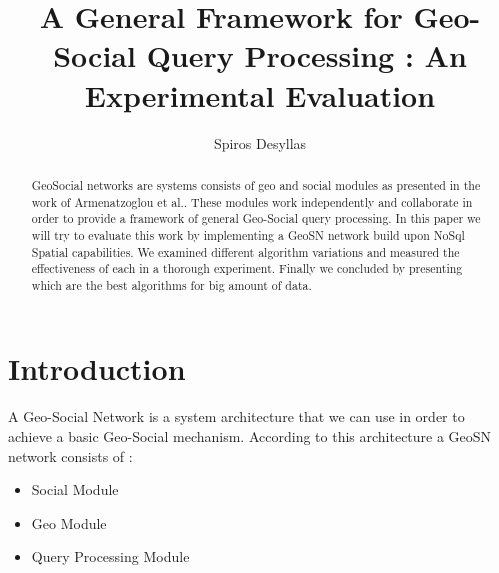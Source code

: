 \documentclass[prodmode,acmtods]{acmsmall} %
\begin{document}

\title{A General Framework for Geo-Social Query Processing
: An Experimental
Evaluation
}
\author{Spiros Desyllas
}

\begin{abstract}
GeoSocial networks are systems consists of geo and social modules as presented in the work of Armenatzoglou et al.\cite{Armenatzoglou:geosn}. These modules work independently and collaborate in order to provide a framework of general Geo-Social query processing. In this paper we will try to evaluate this work by implementing a GeoSN network build upon NoSql Spatial capabilities. We examined different algorithm variations and measured the effectiveness of each in a thorough experiment. Finally we concluded by presenting which are the best algorithms for big amount of data.
\end{abstract}                                                                                     
          
\maketitle
\section{Introduction}
A Geo-Social Network \cite{Armenatzoglou:geosn} is a system architecture that we can use in order to achieve a basic Geo-Social mechanism. According to this architecture a GeoSN network consists of : 

\begin{itemize}
  \item Social Module
  \item Geo Module
  \item Query Processing Module
\end{itemize}
\end{document}
